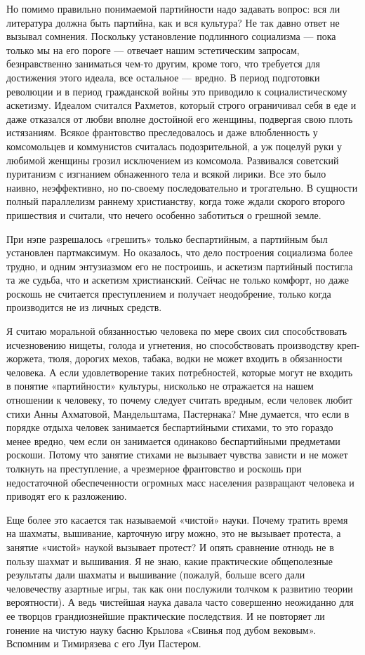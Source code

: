 Но помимо правильно понимаемой партийности надо задавать вопрос: вся
ли литература должна быть партийна, как и вся культура? Не так давно
ответ не вызывал сомнения. Поскольку установление подлинного
социализма --- пока только мы на его пороге --- отвечает нашим
эстетическим запросам, безнравственно заниматься чем-то другим, кроме
того, что требуется для достижения этого идеала, все остальное ---
вредно. В период подготовки революции и в период гражданской войны это
приводило к социалистическому аскетизму. Идеалом считался Рахметов,
который строго ограничивал себя в еде и даже отказался от любви вполне
достойной его женщины, подвергая свою плоть истязаниям. Всякое
франтовство преследовалось и даже влюбленность у комсомольцев и
коммунистов считалась подозрительной, а уж поцелуй руки у любимой
женщины грозил исключением из комсомола. Развивался советский
пуританизм с изгнанием обнаженного тела и всякой лирики. Все это было
наивно, неэффективно, но по-своему последовательно и трогательно. В
сущности полный параллелизм раннему христианству, когда тоже ждали
скорого второго пришествия и считали, что нечего особенно заботиться о
грешной земле.

При нэпе разрешалось «грешить» только беспартийным, а партийным был
установлен партмаксимум. Но оказалось, что дело построения социализма
более трудно, и одним энтузиазмом его не построишь, и аскетизм
партийный постигла та же судьба, что и аскетизм христианский. Сейчас
не только комфорт, но даже роскошь не считается преступлением и
получает неодобрение, только когда производится не из личных средств.

Я считаю моральной обязанностью человека по мере своих сил
способствовать исчезновению нищеты, голода и угнетения, но
способствовать производству креп-жоржета, тюля, дорогих мехов, табака,
водки не может входить в обязанности человека. А если удовлетворение
таких потребностей, которые могут не входить в понятие «партийности»
культуры, нисколько не отражается на нашем отношении к человеку, то
почему следует считать вредным, если человек любит стихи Анны
Ахматовой, Мандельштама, Пастернака? Мне думается, что если в порядке
отдыха человек занимается беспартийными стихами, то это гораздо менее
вредно, чем если он занимается одинаково беспартийными предметами
роскоши. Потому что занятие стихами не вызывает чувства зависти и не
может толкнуть на преступление, а чрезмерное франтовство и роскошь при
недостаточной обеспеченности огромных масс населения развращают
человека и приводят его к разложению.

Еще более это касается так называемой «чистой» науки. Почему тратить
время на шахматы, вышивание, карточную игру можно, это не вызывает
протеста, а занятие «чистой» наукой вызывает протест? И опять
сравнение отнюдь не в пользу шахмат и вышивания. Я не знаю, какие
практические общеполезные результаты дали шахматы и вышивание
(пожалуй, больше всего дали человечеству азартные игры, так как они
послужили толчком к развитию теории вероятности). А ведь чистейшая
наука давала часто совершенно неожиданно для ее творцов грандиознейшие
практические последствия. И не повторяет ли гонение на чистую науку
басню Крылова «Свинья под дубом вековым». Вспомним и Тимирязева с его
Луи Пастером.

